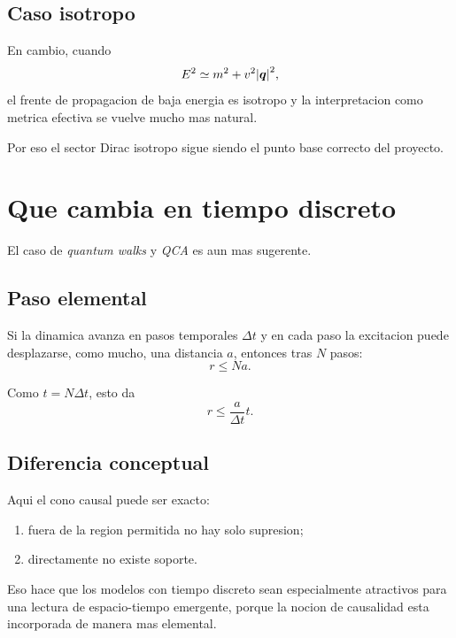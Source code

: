 \subsection{Caso isotropo}
En cambio, cuando
\begin{equation}
E^2 \simeq m^2 + v^2\abs{\bm{q}}^2,
\end{equation}
el frente de propagacion de baja energia es isotropo y la interpretacion como metrica efectiva se vuelve mucho mas natural.

Por eso el sector Dirac isotropo sigue siendo el punto base correcto del proyecto.

\section{Que cambia en tiempo discreto}
El caso de \textit{quantum walks} y \textit{QCA} es aun mas sugerente.

\subsection{Paso elemental}
Si la dinamica avanza en pasos temporales \(\Delta t\) y en cada paso la excitacion puede desplazarse, como mucho, una distancia \(a\), entonces tras \(N\) pasos:
\begin{equation}
r \le Na.
\end{equation}

Como \(t=N\Delta t\), esto da
\begin{equation}
r \le \frac{a}{\Delta t} t.
\label{c19:eq:qwspeed}
\end{equation}

\subsection{Diferencia conceptual}
Aqui el cono causal puede ser exacto:
\begin{enumerate}[label=\arabic*.]
    \item fuera de la region permitida no hay solo supresion;
    \item directamente no existe soporte.
\end{enumerate}

Eso hace que los modelos con tiempo discreto sean especialmente atractivos para una lectura de espacio-tiempo emergente, porque la nocion de causalidad esta incorporada de manera mas elemental.

